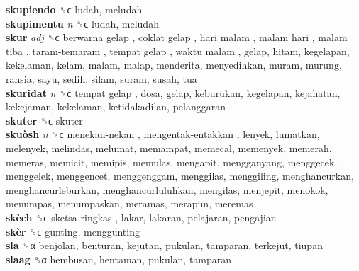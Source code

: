 \textbf{skupiendo} ␝ϲ  ludah, meludah  \\
\textbf{skupimentu} \emph{n}  ␝ϲ  ludah, meludah  \\
\textbf{skur} \emph{adj}  ␝ϲ   berwarna gelap ,  coklat gelap ,  hari malam ,  malam hari ,  malam tiba ,  taram-temaram ,  tempat gelap ,  waktu malam , gelap, hitam, kegelapan, kekelaman, kelam, malam, malap, menderita, menyedihkan, muram, murung, rahsia, sayu, sedih, silam, suram, susah, tua  \\
\textbf{skuridat} \emph{n}  ␝ϲ   tempat gelap , dosa, gelap, keburukan, kegelapan, kejahatan, kekejaman, kekelaman, ketidakadilan, pelanggaran  \\
\textbf{skuter} ␝ϲ  skuter  \\
\textbf{skuòsh} \emph{n}  ␝ϲ   menekan-nekan ,  mengentak-entakkan , lenyek, lumatkan, melenyek, melindas, melumat, memampat, memecal, memenyek, memerah, memeras, memicit, memipis, memulas, mengapit, mengganyang, menggecek, menggelek, menggencet, menggenggam, menggilas, menggiling, menghancurkan, menghancurleburkan, menghancurluluhkan, mengilas, menjepit, menokok, menumpas, menumpaskan, meramas, merapun, meremas  \\
\textbf{skèch} ␝ϲ   sketsa ringkas , lakar, lakaran, pelajaran, pengajian  \\
\textbf{skèr} ␝ϲ  gunting, menggunting  \\
\textbf{sla} ␝α  benjolan, benturan, kejutan, pukulan, tamparan, terkejut, tiupan  \\
\textbf{slaag} ␝α  hembusan, hentaman, pukulan, tamparan  \\
